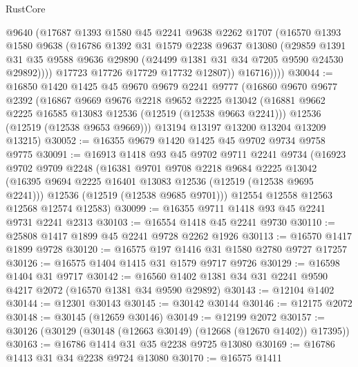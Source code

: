 \begin{lexlean}{RustCore}
\begin{coremodule}
              @9640
              (@17687
                @1393
                @1580
                @45
                @2241
                @9638
                @2262
                @1707
                (@16570
                  @1393
                  @1580
                  @9638
                  (@16786
                    @1392
                    @31
                    @1579
                    @2238
                    @9637
                    @13080
                    (@29859
                      @1391
                      @31
                      @35
                      @9588
                      @9636
                      @29890
                      (@24499 @1381 @31 @34 @7205 @9590 @24530 @29892))))
                @17723
                @17726
                @17729
                @17732
                @12807))
            @16716))))
@30044 := @16850
    @1420
    @1425
    @45
    @9670
    @9679
    @2241
    @9777
    (@16860
      @9670
      @9677
      @2392
      (@16867
        @9669
        @9676
        @2218
        @9652
        @2225
        @13042
        (@16881 @9662 @2225 @16585 @13083 @12536 (@12519 (@12538 @9663 @2241)))
        @12536
        (@12519 (@12538 @9653 @9669)))
      @13194
      @13197
      @13200
      @13204
      @13209
      @13215)
@30052 := @16355 @9679 @1420 @1425 @45 @9702 @9734 @9758 @9775
@30091 := @16913
    @1418
    @93
    @45
    @9702
    @9711
    @2241
    @9734
    (@16923
      @9702
      @9709
      @2248
      (@16381
        @9701
        @9708
        @2218
        @9684
        @2225
        @13042
        (@16395 @9694 @2225 @16401 @13083 @12536 (@12519 (@12538 @9695 @2241)))
        @12536
        (@12519 (@12538 @9685 @9701)))
      @12554
      @12558
      @12563
      @12568
      @12574
      @12583)
@30099 := @16355 @9711 @1418 @93 @45 @2241 @9731 @2241 @2313
@30103 := @16554 @1418 @45 @2241 @9730
@30110 := @25808 @1417 @1899 @45 @2241 @9728 @2262 @1926
@30113 := @16570 @1417 @1899 @9728
@30120 := @16575 @197 @1416 @31 @1580 @2780 @9727 @17257
@30126 := @16575 @1404 @1415 @31 @1579 @9717 @9726
@30129 := @16598 @1404 @31 @9717
@30142 := @16560 @1402 @1381 @34 @31 @2241 @9590 @4217 @2072 (@16570 @1381 @34 @9590 @29892)
@30143 := @12104 @1402
@30144 := @12301 @30143
@30145 := @30142 @30144
@30146 := @12175 @2072
@30148 := @30145 (@12659 @30146)
@30149 := @12199 @2072
@30157 := @30126 (@30129 (@30148 (@12663 @30149) (@12668 (@12670 @1402)) @17395))
@30163 := @16786 @1414 @31 @35 @2238 @9725 @13080
@30169 := @16786 @1413 @31 @34 @2238 @9724 @13080
@30170 := @16575 @1411

\end{coremodule}
\end{lexlean}
